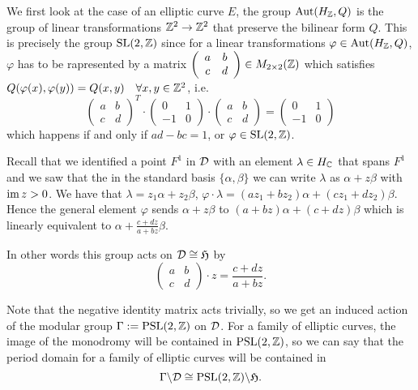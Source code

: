 \documentclass[../main.tex]{subfiles}
\begin{document}
\begin{es} We first look at the case of an elliptic curve $E$, the group $\mathrm{Aut}(H_{\mathbb{Z}},Q)$ is the group of linear transformations $\mathbb{Z}^2 \to \mathbb{Z}^2$ that preserve the bilinear form $Q$. This is precisely the group $\mathrm{SL}(2,\mathbb{Z})$ since for a linear transformations $\varphi \in \mathrm{Aut}(H_{\mathbb{Z}},Q) $, $\varphi$ has to be rapresented by a matrix $\left( \begin{array}{cc} a & b \\ c & d \end{array} \right) \in M_{2\times 2}(\mathbb{Z})$ which satisfies $Q(\varphi(x),\varphi(y))=Q(x,y) \quad \forall x,y \in \mathbb{Z}^2$, i.e. 
\[
\left( \begin{array}{cc} a & b \\ c & d \end{array} \right)^T  \cdot \left( \begin{array}{cc} 0 & 1 \\ -1 & 0 \end{array} \right) \cdot \left( \begin{array}{cc} a & b \\ c & d \end{array} \right) = \left( \begin{array}{cc} 0 & 1 \\ -1 & 0 \end{array} \right)
\]
which happens if and only if $ad-bc=1$, or $\varphi \in  \mathrm{SL}(2,\mathbb{Z})$.

Recall that we identified a point $F^1$ in $\mathcal{D}$ with an element $\lambda \in H_{\mathbb{C}}$ that spans $F^1$ and we saw that the in the standard basis $ \{ \alpha, \beta \}$ we can write $\lambda$ as $\alpha + z\beta$ with $\operatorname{im} z > 0$. 
We have that $\lambda=z_1\alpha + z_2\beta$,  $\varphi \cdot \lambda = (az_1+bz_2)\alpha + (cz_1+dz_2) \beta $. Hence the general element $\varphi$ sends  $\alpha + z\beta$ to $(a+bz)\alpha + (c+dz) \beta$ which is linearly equivalent to $\alpha + \frac{c+dz}{a+bz} \beta$.

In other words this group acts on $\mathcal{D} \cong \mathfrak{H}$ by
\[ \left( \begin{array}{cc} a & b \\ c & d \end{array} \right) \cdot z = \frac{c + dz}{a + bz}. \]

Note that the negative identity matrix acts trivially, so we get an induced action of the modular group $\Gamma := \mathrm{PSL}(2,\mathbb{Z})$ on $\mathcal{D}$. For a family of elliptic curves, the image of the monodromy will be contained in $\mathrm{PSL}(2,\mathbb{Z})$, so we can say that the period domain for a family of elliptic curves will be contained in 
\[ \Gamma \backslash \mathcal{D} \cong \mathrm{PSL}(2,\mathbb{Z}) \backslash \mathfrak{H}.\]
\end{es}
\end{document}
